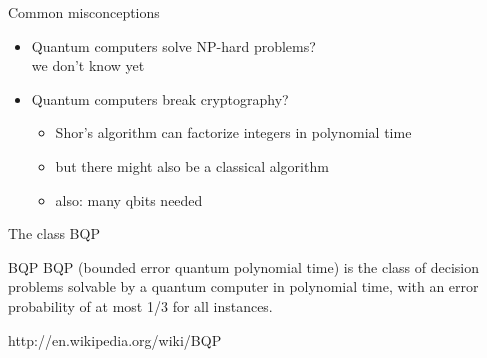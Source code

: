 \documentclass[c]{beamer}
\begin{document}

\begin{frame}{Common misconceptions}
\begin{itemize}
\item Quantum computers solve NP-hard problems? \\
 we don't know yet
\item Quantum computers break cryptography? \\
\begin{itemize}
\item Shor's algorithm can factorize integers in polynomial time
\item but there might also be a classical algorithm
\item also: many qbits needed
\end{itemize}
\end{itemize}
\end{frame}

\begin{frame}{The class BQP}
	\begin{block}{BQP}
		BQP (bounded error quantum polynomial time) is the class of decision problems solvable by a quantum computer in polynomial time, with an error probability of at most 1/3 for all instances.
	\end{block}
	http://en.wikipedia.org/wiki/BQP
\end{frame}
\end{document}
